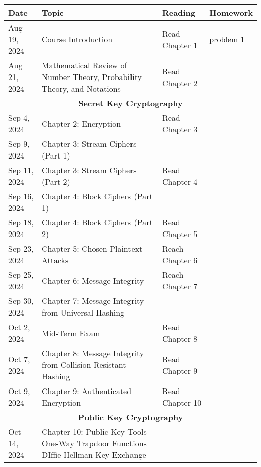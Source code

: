 \documentclass{article}
\begin{document}
\begin{center}
\begin{adjustbox}{width=\textwidth}
\begin{tabular}{|l|p{}|l|l|}
  \hline
  \rowcolor[gray]{0.7}
  \textbf{Date} & \textbf{Topic} & \textbf{Reading} & \textbf{Homework}\\
  \hline
  Aug 19, 2024  & Course Introduction                                & Read Chapter 1& problem 1\\
  \hline
  Aug 21, 2024  & Mathematical Review of Number Theory, Probability Theory, and Notations & Read Chapter 2&\\
    \hline
  \multicolumn{4}{|c|}{\textbf{Secret Key Cryptography}} \\  %
  \hline
  Sep 4, 2024   & Chapter 2: Encryption                                & Read Chapter 3&\\
  \hline
  Sep 9, 2024   & Chapter 3: Stream Ciphers (Part 1)                   & &\\
  \hline
  Sep 11, 2024  & Chapter 3: Stream Ciphers (Part 2)                   & Read Chapter 4&\\
  \hline
  Sep 16, 2024  & Chapter 4: Block Ciphers (Part 1)                    && \\
  \hline
  Sep 18, 2024  & Chapter 4: Block Ciphers (Part 2)                    & Read Chapter 5&\\
  \hline
  Sep 23, 2024  & Chapter 5: Chosen Plaintext Attacks                  & Reach Chapter 6&\\
  \hline
  Sep 25, 2024  & Chapter 6: Message Integrity                         & Reach Chapter 7&\\
  \hline
  Sep 30, 2024  & Chapter 7: Message Integrity from Universal Hashing  &&\\
  \hline
  Oct 2, 2024   & Mid-Term Exam                                       & Read Chapter 8&\\
  \hline
  Oct 7, 2024   & Chapter 8: Message Integrity from Collision Resistant Hashing & Read Chapter 9&\\
  \hline
  Oct 9, 2024   & Chapter 9: Authenticated Encryption                  & Read Chapter 10&\\
  \hline
  \multicolumn{4}{|c|}{\textbf{Public Key Cryptography}} \\  %
  \hline
  Oct 14, 2024  & Chapter 10: Public Key Tools  \newline One-Way Trapdoor Functions \newline DIffie-Hellman Key Exchange                       && \\

\end{tabular}
\end{adjustbox}
\end{center}
\end{document}
